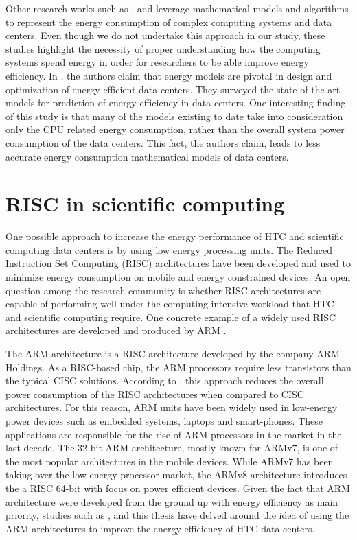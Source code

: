 Other research works such as \cite{ENERGY_ALGORITHMS}, \cite{MODEL1} and \cite{MODEL2} leverage mathematical models and algorithms to represent the energy consumption of complex computing systems and data centers. Even though we do not undertake this approach in our study, these studies highlight the necessity of proper understanding how the computing systems spend energy in order for researchers to be able improve energy efficiency. In \cite{MODEL1}, the authors claim that energy models are pivotal in design and optimization of energy efficient data centers. They surveyed the state of the art models for prediction of energy efficiency in data centers. One interesting finding of this study is that many of the models existing to date take into consideration only the CPU related energy consumption, rather than the overall system power consumption of the data centers. This fact, the authors claim, leads to less accurate energy consumption mathematical models of data centers. 



\section{RISC in scientific computing} %

One possible approach to increase the energy performance of HTC and scientific computing data centers is by using low energy processing units. The Reduced Instruction Set Computing (RISC) architectures have been developed and used to minimize energy consumption on mobile and energy constrained devices. An open question among the research community is whether RISC architectures are capable of performing well under the computing-intensive workload that HTC and scientific computing require. One concrete example of a widely used RISC architectures are developed and produced by ARM \cite{ARM}.

The ARM architecture \cite{ARM} is a RISC architecture developed by the company ARM Holdings. As a RISC-based chip, the ARM processors require less transistors than the typical CISC solutions. According to \cite{CISC_RISC}, this approach reduces the overall power consumption of the RISC architectures when compared to CISC architectures. For this reason, ARM units have been widely used in low-energy power devices such as embedded systems, laptops and smart-phones. These applications are responsible for the rise of ARM processors in the market in the last decade. The 32 bit ARM architecture, mostly known for ARMv7, is one of the most popular architectures in the mobile devices. While ARMv7 has been taking over the low-energy processor market, the ARMv8 architecture \cite{ARMv8} introduces the a RISC 64-bit with focus on power efficient devices. 
Given the fact that ARM architecture were developed from the ground up with energy efficiency as main priority, studies such as \cite{ACAT14ARMDAVID}, \cite{ACAT13ARM} and this thesis have delved around the idea of using the ARM architectures to improve the energy efficiency of HTC data centers. 

